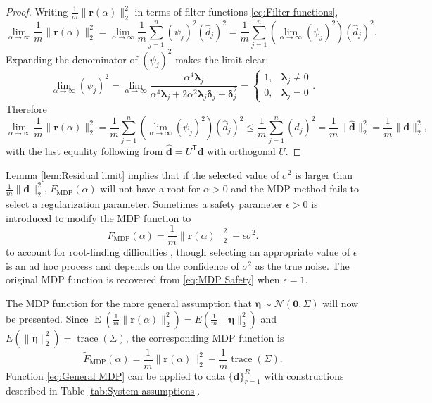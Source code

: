 \documentclass[12pt]{article}
\newcommand{\mA}{m}	%
\newcommand{\dVec}{\mathbf{d}}	%
\newcommand{\rVec}{\mathbf{r}}	%
\newcommand{\trans}[1]{{#1}^\mathsf{T}}	%
\DeclareMathOperator{\trace}{trace}		%
\newcommand{\dft}[1]{\widehat{#1}}	%
\newcommand{\regparam}{\alpha}  %
\newcommand{\mfilt}{\psi}
\newcommand{\noise}{\eta}	%
\newcommand{\noiseSD}{\sigma}	%
\newcommand{\noiseVec}{\bm{\noise}}	%
\DeclareMathOperator{\E}{E}	%
\newcommand{\zeroVec}{\bm{0}}	%
\newcommand{\svd}[1]{\widehat{#1}}	%
\newcommand{\D}{F_{\text{MDP}}}	%
\newcommand{\safeparam}{\epsilon}	%
\newcommand{\DBig}{\widetilde{F}_{\text{MDP}}}	%
\begin{document}
\begin{proof}
Writing $\frac{1}{\mA}\|\rVec(\regparam)\|_2^2$ in terms of filter functions \eqref{eq:Filter functions},
\[\lim_{\regparam\rightarrow\infty} \frac{1}{\mA}\|\rVec(\regparam)\|_2^2 = \lim_{\regparam\rightarrow\infty} \frac{1}{\mA} \sum_{j=1}^{n} \left(\mfilt_j\right)^2\left(\dft{d}_j\right)^2 = \frac{1}{\mA} \sum_{j=1}^{n} \left(\lim_{\regparam\rightarrow\infty}\left(\mfilt_j\right)^2\right)\left(\dft{d}_j\right)^2.\]
Expanding the denominator of $\left(\mfilt_j\right)^2$ makes the limit clear:
\[\lim_{\regparam\rightarrow\infty} \left(\mfilt_j\right)^2 = \lim_{\regparam\rightarrow\infty}\frac{\regparam^4\bm{\lambda}_j}{\regparam^4\bm{\lambda}_j + 2\regparam^2\bm{\lambda}_j\bm{\delta}_j + \bm{\delta}_j^2} = \begin{cases}
1, & \bm{\lambda}_j \neq 0 \\
0, & \bm{\lambda}_j = 0
\end{cases}.\]
Therefore
\[\lim_{\regparam\rightarrow\infty} \frac{1}{\mA}\|\rVec(\regparam)\|_2^2 = \frac{1}{\mA} \sum_{j=1}^{n} \left(\lim_{\regparam\rightarrow\infty}\left(\mfilt_j\right)^2\right)\left(\dft{d}_j\right)^2 \leq \frac{1}{\mA} \sum_{j=1}^{n} \left(\dft{d}_j\right)^2 = \frac{1}{\mA}\|\svd{\dVec}\|_2^2 = \frac{1}{\mA}\|\dVec\|_2^2,\]
with the last equality following from $\svd{\dVec} = \trans{U}\dVec$ with orthogonal $U$.
\end{proof}
\noindent Lemma \ref{lem:Residual limit} implies that if the selected value of $\noiseSD^2$ is larger than $\frac{1}{\mA}\|\dVec\|_2^2$, $\D(\regparam)$ will not have a root for $\regparam > 0$ and the MDP method fails to select a regularization parameter. Sometimes a safety parameter $\safeparam > 0$ is introduced to modify the MDP function to
\begin{equation}
\label{eq:MDP Safety}
\D(\regparam) = \frac{1}{\mA}\|\rVec(\regparam)\|_2^2 - \safeparam\noiseSD^2.
\end{equation}
to account for root-finding difficulties \cite{ABT,IRTools}, though selecting an appropriate value of $\safeparam$ is an ad hoc process and depends on the confidence of $\noiseSD^2$ as the true noise. The original MDP function is recovered from \eqref{eq:MDP Safety} when $\safeparam = 1$. \par
The MDP function for the more general assumption that $\noiseVec \sim \mathcal{N}(\zeroVec,\Sigma)$ will now be presented. Since $\E(\frac{1}{\mA}\|\rVec(\regparam)\|_2^2) = E(\frac{1}{\mA}\|\noiseVec\|_2^2)$ and $E(\|\noiseVec\|_2^2) = \trace(\Sigma)$, the corresponding MDP function is
\begin{equation}
\label{eq:General MDP}
\DBig(\regparam) = \frac{1}{\mA}\|\rVec(\regparam)\|_2^2 - \frac{1}{\mA}\trace\left(\Sigma\right).
\end{equation}
Function \eqref{eq:General MDP} can be applied to data $\{\dVec\}_{r=1}^R$ with constructions described in Table \ref{tab:System assumptions}. 
\end{document}
